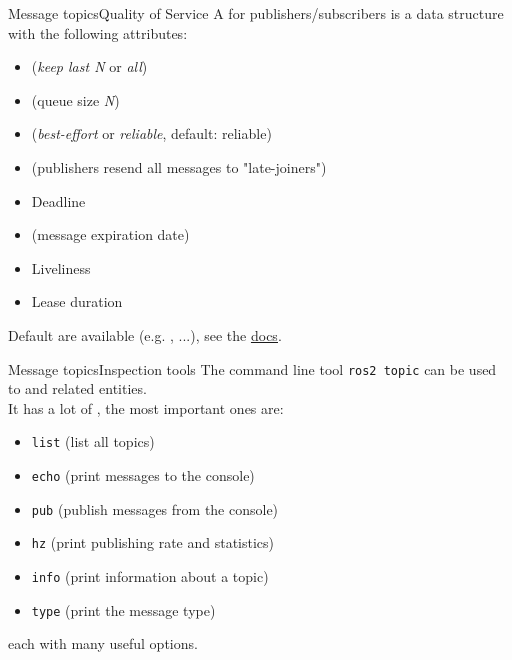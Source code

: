 \begin{frame}{Message topics}{Quality of Service}
	A  for publishers/subscribers is a data structure with the following attributes:
	\begin{itemize}
		\item {} (\emph{keep last N} or \emph{all})
		\item {} (queue size \emph{N})
		\item {} (\emph{best-effort} or \emph{reliable}, default: reliable)
		\item {} (publishers resend all messages to "late-joiners")
		\item Deadline
		\item {} (message expiration date)
		\item Liveliness
		\item Lease duration
	\end{itemize}
	Default  are available (e.g. , ...), see the \href{https://docs.ros.org/en/humble/Concepts/About-Quality-of-Service-Settings.html}{\color{blue}\underline{docs}}.
\end{frame}
\begin{frame}{Message topics}{Inspection tools}
  The command line tool \texttt{ros2 topic} can be used to  and related entities.\\
  It has a lot of , the most important ones are:
  \begin{itemize}
    \item \texttt{list} (list all topics)
    \item \texttt{echo} (print messages to the console)
    \item \texttt{pub} (publish messages from the console)
    \item \texttt{hz} (print publishing rate and statistics)
    \item \texttt{info} (print information about a topic)
    \item \texttt{type} (print the message type)
  \end{itemize}
  each with many useful options.
\end{frame}

